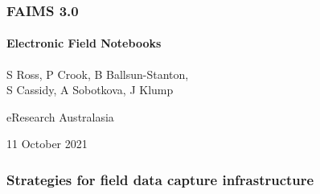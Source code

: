 \documentclass[
	aspectratio=169, %
	12pt, %
	t, %
]{beamer}
\begin{document}
\begin{refsegment}




\begin{titleframe} %
	\frametitle{FAIMS 3.0}
	\framesubtitle{Electronic Field Notebooks}

	S Ross, P Crook, B Ballsun-Stanton,\\ S Cassidy, A Sobotkova, J Klump

    \bigskip
	eResearch Australasia 

	\bigskip

	11 October 2021
\end{titleframe}





\begin{frame}
    \frametitle{Strategies for field data capture infrastructure}
    

\end{frame}
\end{refsegment}
\end{document}
